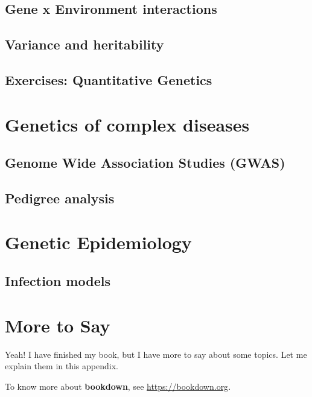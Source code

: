 \documentclass[12pt,]{krantz}
\theoremstyle{definition}
\theoremstyle{definition}
\theoremstyle{remark}
\begin{document}
\section{Gene x Environment
interactions}\label{gene-x-environment-interactions}

\section{Variance and heritability}\label{variance-and-heritability}

\section*{Exercises: Quantitative
Genetics}\label{exercises-quantitative-genetics}


\chapter{Genetics of complex
diseases}\label{genetics-of-complex-diseases}

\section{Genome Wide Association Studies
(GWAS)}\label{genome-wide-association-studies-gwas}

\section{Pedigree analysis}\label{pedigree-analysis}

\chapter{Genetic Epidemiology}\label{genetic-epidemiology}

\section{Infection models}\label{infection-models}

\cleardoublepage 

\appendix {}


\chapter{More to Say}\label{more-to-say}

Yeah! I have finished my book, but I have more to say about some topics.
Let me explain them in this appendix.

To know more about \textbf{bookdown}, see \url{https://bookdown.org}.



\printindex
\end{document}
